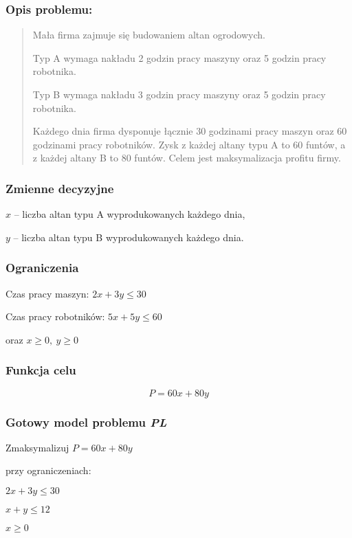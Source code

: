 \subsubsection*{Opis problemu:} \label{sec:model_example}
\begin{quote}
Mała firma zajmuje się budowaniem altan ogrodowych.

Typ A wymaga nakładu 2 godzin pracy maszyny oraz 5 godzin pracy robotnika.  

Typ B wymaga nakładu 3 godzin pracy maszyny oraz 5 godzin pracy robotnika. 

Każdego dnia firma dysponuje łącznie 30 godzinami pracy maszyn oraz 60 godzinami pracy robotników. Zysk z każdej altany typu A to 60 funtów, a z każdej altany B to 80 funtów. Celem jest maksymalizacja profitu firmy.

\end{quote}

\subsubsection*{Zmienne decyzyjne}

$x$ – liczba altan typu A wyprodukowanych każdego dnia,

$y$ – liczba altan typu B wyprodukowanych każdego dnia.

\subsubsection*{Ograniczenia}

Czas pracy maszyn: $2x + 3y \leq 30$

Czas pracy robotników: $5x + 5y \leq 60$

oraz $x \geq 0, \ y \geq 0$


\subsubsection*{Funkcja celu}
\[
    P = 60x + 80y
\]

\subsubsection*{Gotowy model problemu \textit{PL}}
    Zmaksymalizuj $P = 60x + 80y$

przy ograniczeniach:

    $2x + 3y \leq 30$
    
    $x + y \leq 12$
    
    $x  \geq 0$
    
